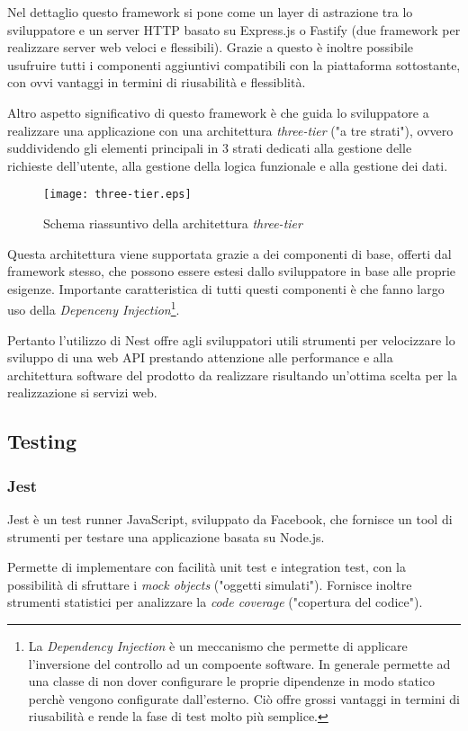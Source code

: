 Nel dettaglio questo framework si pone come un layer di astrazione tra lo sviluppatore e un server HTTP basato su Express.js o Fastify (due framework per realizzare
server web veloci e flessibili). Grazie a questo è inoltre possibile usufruire tutti i componenti aggiuntivi compatibili con la piattaforma sottostante, con ovvi
vantaggi in termini di riusabilità e flessiblità.

Altro aspetto significativo di questo framework è che guida lo sviluppatore a realizzare una applicazione con una architettura \textit{three-tier} ("a tre strati"),
ovvero suddividendo gli elementi principali in 3 strati dedicati alla gestione delle richieste dell'utente, alla gestione della logica funzionale e alla gestione dei dati.
\newpage
\begin{figure}[h]
    \centering
    \texttt{[image: three-tier.eps]}
    \caption{Schema riassuntivo della architettura \textit{three-tier}}
    \label{fig:three-tier}
\end{figure}

Questa architettura viene supportata grazie a dei componenti di base, offerti dal framework stesso, che possono
essere estesi dallo sviluppatore in base alle proprie esigenze.
Importante caratteristica di tutti questi componenti è che fanno largo uso della
\textit{Depenceny Injection}\footnote{
    La \textit{Dependency Injection} è un meccanismo che permette di applicare
    l'inversione del controllo ad un compoente software. In generale permette ad una classe di non dover configurare
    le proprie dipendenze in modo statico perchè vengono configurate dall'esterno. Ciò offre grossi vantaggi in termini di riusabilità e rende la fase di test molto più semplice.}.

Pertanto l'utilizzo di Nest offre agli sviluppatori utili strumenti per velocizzare lo sviluppo di una web API prestando attenzione
alle performance e alla architettura software del prodotto da realizzare risultando un'ottima scelta per la realizzazione si servizi web.

\subsection{Testing}
\subsubsection{Jest}
Jest\cite{Jest} è un test runner JavaScript, sviluppato da Facebook, che fornisce un tool di strumenti per testare una applicazione basata su Node.js.

Permette di implementare con facilità unit test e integration test, con la possibilità di
sfruttare i \textit{mock objects} ("oggetti simulati"). Fornisce inoltre strumenti statistici per analizzare
la \textit{code coverage} ("copertura del codice").


